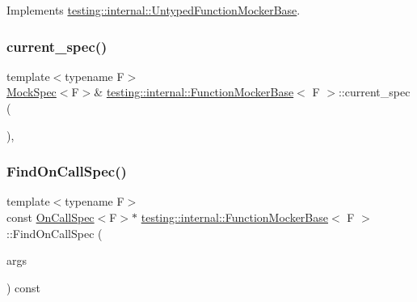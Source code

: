 Implements \hyperlink{classtesting_1_1internal_1_1_untyped_function_mocker_base_a40ddd95736946a7951033aa89a7b617f}{testing\+::internal\+::\+Untyped\+Function\+Mocker\+Base}.

\mbox{\label{classtesting_1_1internal_1_1_function_mocker_base_a744318106e20b346f4f1efbf5a601644}} 
\subsubsection{\texorpdfstring{current\+\_\+spec()}{current\_spec()}}
{\footnotesize\ttfamily template$<$typename F$>$ \\
\hyperlink{classtesting_1_1internal_1_1_mock_spec}{Mock\+Spec}$<$F$>$\& \hyperlink{classtesting_1_1internal_1_1_function_mocker_base}{testing\+::internal\+::\+Function\+Mocker\+Base}$<$ F $>$\+::current\+\_\+spec (\begin{DoxyParamCaption}{ }\end{DoxyParamCaption})\hspace{0.3cm}{\ttfamily [inline]}, {\ttfamily [protected]}}

\mbox{\label{classtesting_1_1internal_1_1_function_mocker_base_a3bcd2e8191ffc44bd59b8d8d25eefd3e}} 
\subsubsection{\texorpdfstring{Find\+On\+Call\+Spec()}{FindOnCallSpec()}}
{\footnotesize\ttfamily template$<$typename F$>$ \\
const \hyperlink{classtesting_1_1internal_1_1_on_call_spec}{On\+Call\+Spec}$<$F$>$$\ast$ \hyperlink{classtesting_1_1internal_1_1_function_mocker_base}{testing\+::internal\+::\+Function\+Mocker\+Base}$<$ F $>$\+::Find\+On\+Call\+Spec (\begin{DoxyParamCaption}\item[{const \hyperlink{classtesting_1_1internal_1_1_function_mocker_base_a336432a07e544af4ffb8103603471ca3}{Argument\+Tuple} \&}]{args }\end{DoxyParamCaption}) const\hspace{0.3cm}{\ttfamily [inline]}}

